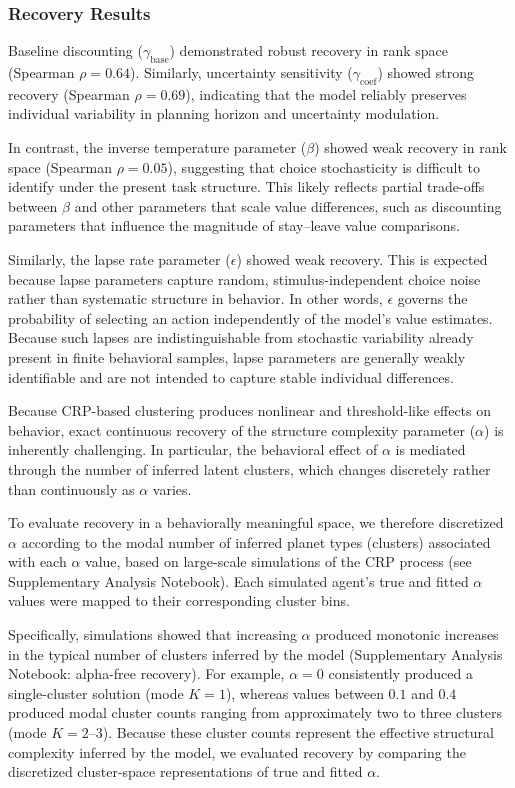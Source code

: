 \documentclass[12pt]{article}
\begin{document}
\subsubsection*{Recovery Results}

Baseline discounting (\(\gamma_{\text{base}}\)) demonstrated robust recovery in rank space (Spearman \(\rho = 0.64\)). Similarly, uncertainty sensitivity (\(\gamma_{\text{coef}}\)) showed strong recovery (Spearman \(\rho = 0.69\)), indicating that the model reliably preserves individual variability in planning horizon and uncertainty modulation.

In contrast, the inverse temperature parameter (\(\beta\)) showed weak recovery in rank space (Spearman \(\rho = 0.05\)), suggesting that choice stochasticity is difficult to identify under the present task structure. This likely reflects partial trade-offs between \(\beta\) and other parameters that scale value differences, such as discounting parameters that influence the magnitude of stay–leave value comparisons.

Similarly, the lapse rate parameter (\(\epsilon\)) showed weak recovery. This is expected because lapse parameters capture random, stimulus-independent choice noise rather than systematic structure in behavior. In other words, \(\epsilon\) governs the probability of selecting an action independently of the model's value estimates. Because such lapses are indistinguishable from stochastic variability already present in finite behavioral samples, lapse parameters are generally weakly identifiable and are not intended to capture stable individual differences. 

Because CRP-based clustering produces nonlinear and threshold-like effects on behavior, exact continuous recovery of the structure complexity parameter (\(\alpha\)) is inherently challenging. In particular, the behavioral effect of \(\alpha\) is mediated through the number of inferred latent clusters, which changes discretely rather than continuously as \(\alpha\) varies. 

To evaluate recovery in a behaviorally meaningful space, we therefore discretized \(\alpha\) according to the modal number of inferred planet types (clusters) associated with each \(\alpha\) value, based on large-scale simulations of the CRP process (see Supplementary Analysis Notebook). Each simulated agent's true and fitted \(\alpha\) values were mapped to their corresponding cluster bins.


Specifically, simulations showed that increasing \(\alpha\) produced monotonic increases in the typical number of clusters inferred by the model (Supplementary Analysis Notebook: alpha-free recovery). For example, \(\alpha = 0\) consistently produced a single-cluster solution (mode \(K = 1\)), whereas values between \(0.1\) and \(0.4\) produced modal cluster counts ranging from approximately two to three clusters (mode \(K = 2\)–3). Because these cluster counts represent the effective structural complexity inferred by the model, we evaluated recovery by comparing the discretized cluster-space representations of true and fitted \(\alpha\).
\end{document}
